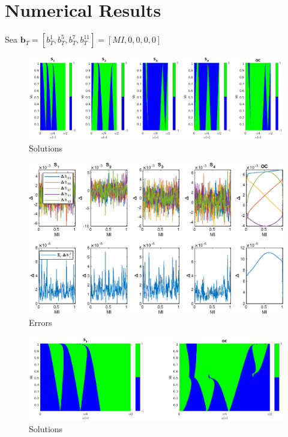 \section{Numerical Results}

Sea $\bm{b}_T = [b_T^1,b_T^5,b_T^7,b_T^{11}] = [MI,0,0,0,0]$
\begin{figure}
    \centering
    \includegraphics[scale=0.45]{img/EX01_surf.eps}
    \caption{Solutions}
\end{figure}



\begin{figure}
    \centering
    \includegraphics[scale=0.8]{img/EX01.eps}
    \caption{Errors}
\end{figure}


\begin{figure}
    \centering
    \includegraphics[scale=0.35]{img/EX01_surf_3LVL.eps}
    \caption{Solutions}
\end{figure}



